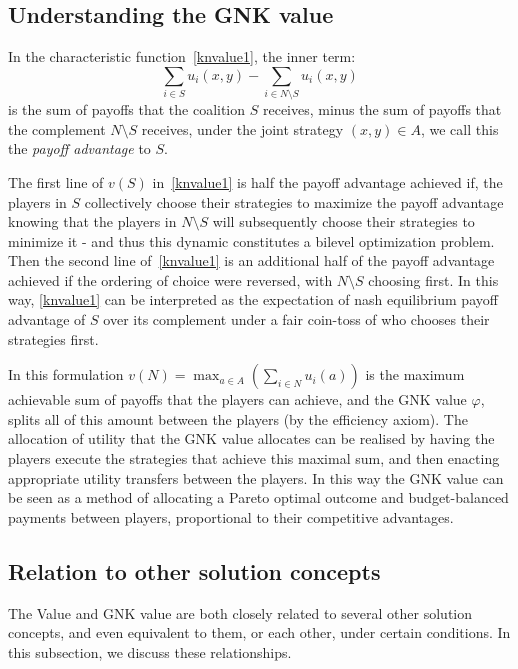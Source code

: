 \subsection{Understanding the GNK value}\label{the_value_def4}

In the characteristic function~\eqref{knvalue1}, the inner term:
\[
\sum_{i\in S} u_i(x,y) - \sum_{i\in N\setminus S} u_i(x,y)
\] 
is the sum of payoffs that the coalition $S$ receives, 
minus the sum of payoffs that the complement $N\setminus S$ receives, 
under the joint strategy $(x,y)\in A$, we call this the \textit{payoff advantage} to $S$.

The first line of $v(S)$ in~\eqref{knvalue1} is half the payoff advantage achieved if, the players in $S$ collectively choose their strategies to maximize the payoff advantage knowing that the players in $N\setminus S$ will subsequently choose their strategies to minimize it - and thus this dynamic constitutes a bilevel optimization problem.
Then the second line of~\eqref{knvalue1} is an additional half of the payoff advantage achieved if the ordering of choice were reversed, with $N\setminus S$ choosing first.
In this way, \eqref{knvalue1} can be interpreted as the expectation of nash equilibrium payoff advantage of $S$ over its complement under a fair coin-toss of who chooses their strategies first.

In this formulation $v(N) = \max_{a\in A} (\sum_{i\in N} u_i(a))$ is the maximum achievable sum of payoffs that the players can achieve, and the GNK value $\varphi$, splits all of this amount between the players (by the efficiency axiom).
The allocation of utility that the GNK value allocates can be realised by having the players execute the strategies that achieve this maximal sum, and then enacting appropriate utility transfers between the players.
In this way the GNK value can be seen as a method of allocating a Pareto optimal outcome and budget-balanced payments between players, proportional to their competitive advantages.

\subsection{Relation to other solution concepts}\label{relating_to_the_old}

The Value and GNK value are both closely related to several other solution concepts, and even equivalent to them, or each other, under certain conditions. In this subsection, we discuss these relationships.

